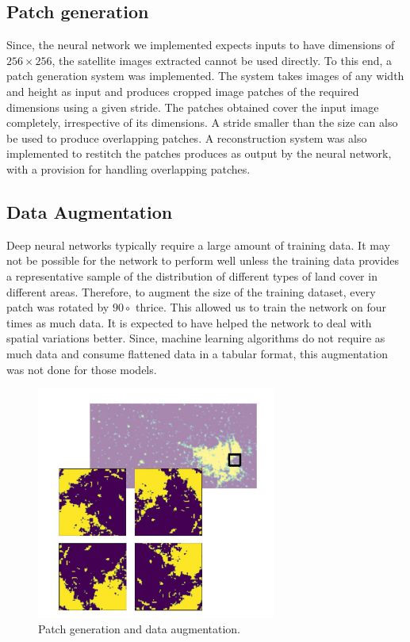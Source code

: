 \documentclass[12pt, a4paper]{report}
\begin{document}
\subsection{Patch generation}
Since, the neural network we implemented expects inputs to have dimensions of $256 \times 256$, the satellite images extracted cannot be used directly. To this end, a patch generation system was implemented. The system takes images of any width and height as input and produces cropped image patches of the required dimensions using a given stride. The patches obtained cover the input image completely, irrespective of its dimensions. A stride smaller than the size can also be used to produce overlapping patches. A reconstruction system was also implemented to restitch the patches produces as output by the neural network, with a provision for handling overlapping patches.
\subsection{Data Augmentation}
Deep neural networks typically require a large amount of training data. It may not be possible for the network to perform well unless the training data provides a representative sample of the distribution of different types of land cover in different areas. Therefore, to augment the size of the training dataset, every patch was rotated by $90\circ$ thrice. This allowed us to train the network on four times as much data. It is expected to have helped the network to deal with spatial variations better. Since, machine learning algorithms do not require as much data and consume flattened data in a tabular format, this augmentation was not done for those models.
\begin{figure}[h]
\centering
\includegraphics[width=0.7\textwidth]{dataaug.jpg}
\caption{Patch generation and data augmentation.}
\end{figure}
\end{document}
